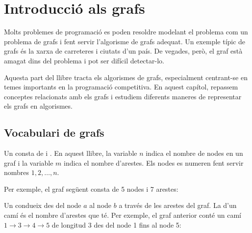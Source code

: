 \chapter{Introducció als grafs}

Molts problemes de programació es poden resoldre modelant el problema
com un problema de grafs i fent servir l'algorisme de grafs
adequat. Un exemple típic de grafs és la xarxa de carreteres i ciutats
d'un país. De vegades, però, el graf està amagat dins del problema i
pot ser difícil detectar-lo.

Aquesta part del llibre tracta els algorismes de grafs, especialment
centrant-se en temes importants en la programació competitiva. En
aquest capítol, repassem conceptes relacionats amb els grafs i
estudiem diferents maneres de representar els grafs en algorismes.

\section{Vocabulari de grafs}

  

Un  consta de  i . En aquest llibre,
la variable $n$ indica el nombre de nodes en un graf i la variable $m$
indica el nombre d'arestes. Els nodes es numeren fent servir nombres
$1,2,\ldots,n$.

Per exemple, el graf següent consta de 5 nodes i 7 arestes:


\begin{center}
\end{center}



Un  condueix des del node $a$ al node $b$ a través de les
arestes del graf. La  d'un camí és el nombre d'arestes
que té.  Per exemple, el graf anterior conté un camí $1 \rightarrow 3
\rightarrow 4 \rightarrow 5$ de longitud 3 des del node 1 fins al node
5:


